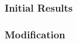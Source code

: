 \subsubsection{Initial Results}

\subsubsection{Modification}




\newpage
























%





